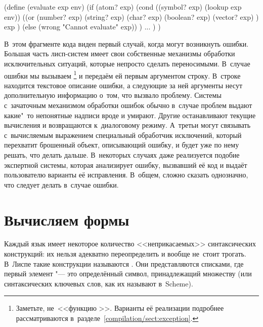 
\begin{code:lisp}
(define (evaluate exp env)
  (if (atom? exp)
      (cond ((symbol? exp) (lookup exp env))
            ((or (number? exp) (string? exp) (char? exp)
                 (boolean? exp) (vector? exp) )
             exp )
            (else (wrong "Cannot evaluate" exp)) )
      ... ) )
\end{code:lisp}


В~этом фрагменте кода виден первый случай, когда могут возникнуть ошибки.
Большая часть лисп-систем имеет свои собственные механизмы обработки
исключительных ситуаций, которые непросто сделать переносимыми. В~случае ошибки
мы вызываем \footnote{Заметьте, не~<<функцию >>. Варианты её
реализации подробнее рассматриваются в~разделе~\ref{compilation/sect:exception}.}
и передаём ей первым аргументом строку. В~строке находится текстовое описание
ошибки, а следующие за ней аргументы несут дополнительную информацию о~том, что
вызвало проблему. Системы с~зачаточным механизмом обработки ошибок обычно
в~случае проблем выдают какие"~то непонятные надписи вроде  и умирают. Другие останавливают текущие вычисления и возвращаются
к~диалоговому режиму. А~третьи могут связывать с~вычисляемым выражением
специальный обработчик исключений, который перехватит брошенный объект,
описывающий ошибку, и будет уже по нему решать, что делать дальше.
 В~некоторых случаях даже реализуется
подобие экспертной системы, которая анализирует ошибку, вызвавший её код и
выдаёт пользователю варианты её исправления. В~общем, сложно сказать однозначно,
что следует делать в~случае ошибки.


\section{Вычисляем формы}\label{basics/sect:evaluating-forms}

Каждый язык имеет некоторое количество <<неприкасаемых>> синтаксических
конструкций: их нельзя адекватно переопределить и вообще не~стоит трогать.
В~Лиспе такие конструкции называются . Они
представляются списками, где первый элемент "--- это определённый символ,
принадлежащий множеству  (или синтаксических
ключевых слов, как их называют в~Scheme).

